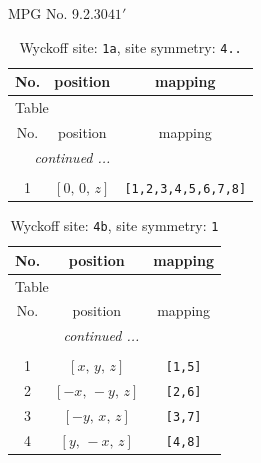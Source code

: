 \documentclass[fleqn,8pt]{jsarticle}
\begin{document}
\setcounter{MaxMatrixCols}{32}

\renewcommand{\tablename}{Table~}
\renewcommand{\figurename}{Figure~}
\begin{center}
\LARGE
MPG No. 9.2.30\quad$41'$
\end{center}
\renewcommand{\arraystretch}{1.2}
\begin{longtable}{ccc}
\caption{Wyckoff site: {\tt 1a}, site symmetry: {\tt 4..}}
 \\
 \hline \hline
No. & position & mapping \\ \hline \endfirsthead

\multicolumn{2}{l}{\tablename\ \thetable{}} \\
 \hline \hline
No. & position & mapping \\ \hline \endhead

 \hline \hline
\multicolumn{2}{r}{\footnotesize\it continued ...} \\ \endfoot

 \hline \hline
\multicolumn{2}{r}{} \\ \endlastfoot

1 & $\left[ 0,\, 0,\, z \right]$ & {\tt [1,2,3,4,5,6,7,8]} \\
\end{longtable}
\renewcommand{\arraystretch}{1.2}
\begin{longtable}{ccc}
\caption{Wyckoff site: {\tt 4b}, site symmetry: {\tt 1}}
 \\
 \hline \hline
No. & position & mapping \\ \hline \endfirsthead

\multicolumn{2}{l}{\tablename\ \thetable{}} \\
 \hline \hline
No. & position & mapping \\ \hline \endhead

 \hline \hline
\multicolumn{2}{r}{\footnotesize\it continued ...} \\ \endfoot

 \hline \hline
\multicolumn{2}{r}{} \\ \endlastfoot

1 & $\left[ x,\, y,\, z \right]$ & {\tt [1,5]} \\ \hline
2 & $\left[ - x,\, - y,\, z \right]$ & {\tt [2,6]} \\ \hline
3 & $\left[ - y,\, x,\, z \right]$ & {\tt [3,7]} \\ \hline
4 & $\left[ y,\, - x,\, z \right]$ & {\tt [4,8]} \\
\end{longtable}
\end{document}
